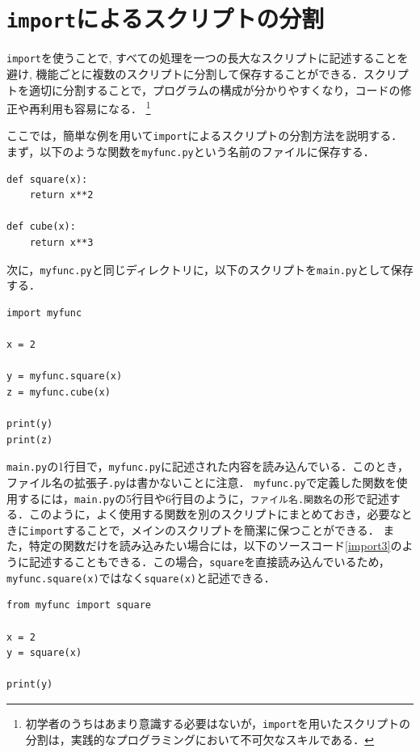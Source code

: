\documentclass[a4paper,12pt]{jsarticle}
\begin{document}
\section{\texttt{import}によるスクリプトの分割}

\texttt{import}を使うことで, すべての処理を一つの長大なスクリプトに記述することを避け, 機能ごとに複数のスクリプトに分割して保存することができる．スクリプトを適切に分割することで，プログラムの構成が分かりやすくなり，コードの修正や再利用も容易になる．
\footnote{
初学者のうちはあまり意識する必要はないが，\texttt{import}を用いたスクリプトの分割は，実践的なプログラミングにおいて不可欠なスキルである．
}

ここでは，簡単な例を用いて\texttt{import}によるスクリプトの分割方法を説明する．まず，以下のような関数を\texttt{myfunc.py}という名前のファイルに保存する．

\begin{lstlisting}[caption=\texttt{myfunc.py}に保存する関数,label=import1]
def square(x):
    return x**2

def cube(x):
    return x**3
\end{lstlisting}

次に，\texttt{myfunc.py}と同じディレクトリに，以下のスクリプトを\texttt{main.py}として保存する．

\begin{lstlisting}[caption=\texttt{myfunc.py}を読み込むスクリプト,label=import2]
import myfunc

x = 2

y = myfunc.square(x)
z = myfunc.cube(x)

print(y)
print(z)
\end{lstlisting}

\texttt{main.py}の1行目で，\texttt{myfunc.py}に記述された内容を読み込んでいる．このとき，ファイル名の拡張子\texttt{.py}は書かないことに注意．
\texttt{myfunc.py}で定義した関数を使用するには，\texttt{main.py}の5行目や6行目のように，\texttt{ファイル名.関数名}の形で記述する．このように，よく使用する関数を別のスクリプトにまとめておき，必要なときに\texttt{import}することで，メインのスクリプトを簡潔に保つことができる．
また，特定の関数だけを読み込みたい場合には，以下のソースコード\ref{import3}のように記述することもできる．この場合，\texttt{square}を直接読み込んでいるため，\texttt{myfunc.square(x)}ではなく\texttt{square(x)}と記述できる．

\begin{lstlisting}[caption=特定の関数のみを読み込む方法,label=import3]
from myfunc import square

x = 2
y = square(x)

print(y)
\end{lstlisting}
\end{document}
